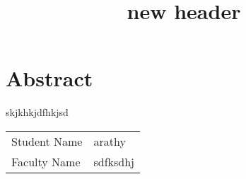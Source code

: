 \documentclass{article}
\begin{document}
    \title{\textbf{new header}}
    \author{}
    \date{}

    \maketitle

    \section*{Abstract}
    skjkhkjdfhkjsd

    \vspace{10pt}

    \begin{tabular}{|l|l|}
    \hline
    Student Name & arathy \\
    Faculty Name & sdfksdhj \\
    \hline
    \end{tabular}

    
\end{document}
